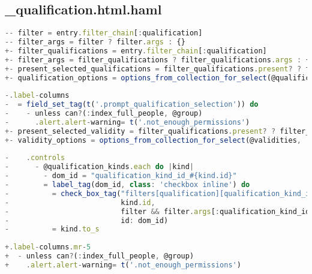 \subsection{\_qualification.html.haml}
\begin{lstlisting}[language=JavaScript]
-- filter = entry.filter_chain[:qualification]
-- filter_args = filter ? filter.args : {}
+- filter_qualifications = entry.filter_chain[:qualification]
+- filter_args = filter_qualifications ? filter_qualifications.args : {}
+- present_selected_qualifications = filter_qualifications.present? ? filter_qualifications.to_hash[:qualification_kind_ids] : []
+- qualification_options = options_from_collection_for_select(@qualification_kinds, :second, :first, present_selected_qualifications)
 
-.label-columns
-  = field_set_tag(t('.prompt_qualification_selection')) do
-    - unless can?(:index_full_people, @group)
-      .alert.alert-warning= t('.not_enough_permissions')
+- present_selected_validity = filter_qualifications.present? ? filter_qualifications.to_hash[:validity] : []
+- validity_options = options_from_collection_for_select(@validities, :second, :first, present_selected_validity)
 
-    .controls
-      - @qualification_kinds.each do |kind|
-        - dom_id = "qualification_kind_id_#{kind.id}"
-        = label_tag(dom_id, class: 'checkbox inline') do
-          = check_box_tag("filters[qualification][qualification_kind_ids][]",
-                          kind.id,
-                          filter && filter.args[:qualification_kind_ids].include?(kind.id),
-                          id: dom_id)
-          = kind.to_s
 
+.label-columns.mr-5
+  - unless can?(:index_full_people, @group)
+    .alert.alert-warning= t('.not_enough_permissions')
 

\end{lstlisting}
